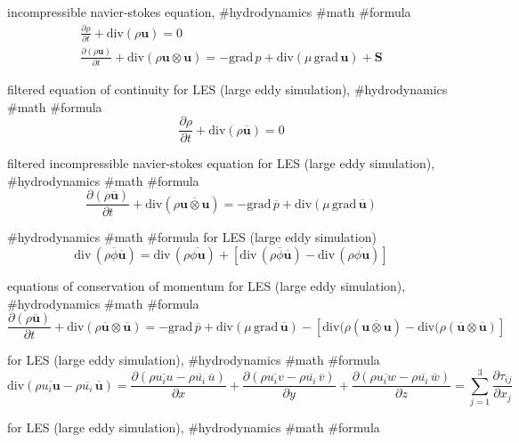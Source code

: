 incompressible navier-stokes equation, #hydrodynamics #math #formula
$$
\begin{array}{l}
\displaystyle\frac{\partial \rho}{\partial t}+\mathrm{div}(\rho\boldsymbol{u})=0 \\
\displaystyle\frac{\partial (\rho\boldsymbol{u})}{\partial t}+\mathrm{div}(\rho\boldsymbol{u}\otimes\boldsymbol{u})=-\mathrm{grad}\,p+\mathrm{div}(\mu\,\mathrm{grad}\,\boldsymbol{u})+\boldsymbol{S}
\end{array}
$$

filtered equation of continuity for LES (large eddy simulation), #hydrodynamics #math #formula
$$
\frac{\partial \rho}{\partial t}+\mathrm{div}(\rho\overline{\boldsymbol{u}})=0
$$

filtered incompressible navier-stokes equation for LES (large eddy simulation), #hydrodynamics #math #formula
$$
\frac{\partial (\rho\overline{\boldsymbol{u}})}{\partial t}+\mathrm{div}(\rho\overline{\boldsymbol{u}\otimes\boldsymbol{u}})=-\mathrm{grad}\,\overline{p}+\mathrm{div}(\mu\,\mathrm{grad}\,\overline{\boldsymbol{u}})
$$

#hydrodynamics #math #formula for LES (large eddy simulation)
$$
\mathrm{div}\,(\rho\overline{\phi}\overline{\boldsymbol{u}})=\mathrm{div}\,(\rho\overline{\phi\boldsymbol{u}})+[\mathrm{div}\,(\rho\overline{\phi}\overline{\boldsymbol{u}})-\mathrm{div}\,(\rho\overline{\phi\boldsymbol{u}})]
$$

equations of conservation of momentum for LES (large eddy simulation), #hydrodynamics #math #formula
$$
\frac{\partial (\rho\overline{\boldsymbol{u}})}{\partial t}+\mathrm{div}(\rho\overline{\boldsymbol{u}}\otimes\overline{\boldsymbol{u}})=-\mathrm{grad}\,\overline{p}+\mathrm{div}(\mu\,\mathrm{grad}\,\overline{\boldsymbol{u}})-[\mathrm{div}(\rho(\overline{\boldsymbol{u}\otimes\boldsymbol{u}})-\mathrm{div}(\rho(\overline{\boldsymbol{u}}\otimes\overline{\boldsymbol{u}})]
$$

for LES (large eddy simulation), #hydrodynamics #math #formula
$$
\mathrm{div}(\rho\overline{u_i\boldsymbol{u}}-\rho\overline{u_i}\,\overline{\boldsymbol{u}})=\frac{\partial(\rho\overline{u_i u}-\rho\overline{u_i}\,\overline{u})}{\partial x}+\frac{\partial(\rho\overline{u_i v}-\rho\overline{u_i}\,\overline{v})}{\partial y}+\frac{\partial(\rho\overline{u_i w}-\rho\overline{u_i}\,\overline{w})}{\partial z}=\sum^3_{j=1}\frac{\partial \tau_{ij}}{\partial x_j}
$$

for LES (large eddy simulation), #hydrodynamics #math #formula



